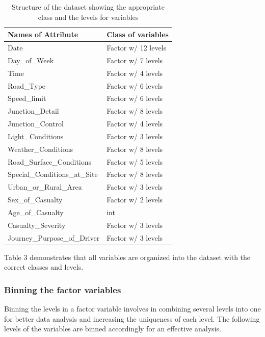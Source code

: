 \documentclass[
  a4paper,
]{article}
\begin{document}
\begin{table}[h]
\caption{Structure of the dataset showing the appropriate class and the levels for variables}
\bigskip
\centering
\begin{tabular}{l l}
\hline\hline
Names of Attribute & Class of variables\\ [0.75ex]
\hline
Date &  Factor w/ 12 levels  \\
Day\_of\_Week & Factor w/ 7 levels \\
Time & Factor w/ 4 levels \\
Road\_Type & Factor w/ 6 levels \\
Speed\_limit & Factor w/ 6 levels  \\
Junction\_Detail & Factor w/ 8 levels \\
Junction\_Control & Factor w/ 4 levels \\
Light\_Conditions  & Factor w/ 3 levels\\
Weather\_Conditions   & Factor w/ 8 levels\\
Road\_Surface\_Conditions  & Factor w/ 5 levels\\
Special\_Conditions\_at\_Site  & Factor w/ 8 levels\\
Urban\_or\_Rural\_Area  & Factor w/ 3 levels\\ 
Sex\_of\_Casualty   & Factor w/ 2 levels\\
Age\_of\_Casualty  & int\\
Casualty\_Severity  & Factor w/ 3 levels\\
Journey\_Purpose\_of\_Driver & Factor w/ 3 levels \\ [1ex]
\hline
\end{tabular}
\label{tab:Table 3}
\end{table}

\bigskip
\newpage

Table 3 demonstrates that all variables are organized into the dataset
with the correct classes and levels.

\hypertarget{binning-the-factor-variables}{%
\subsubsection{Binning the factor
variables}\label{binning-the-factor-variables}}

Binning the levels in a factor variable involves in combining several
levels into one for better data analysis and increasing the uniqueness
of each level. The following levels of the variables are binned
accordingly for an effective analysis.
\end{document}
